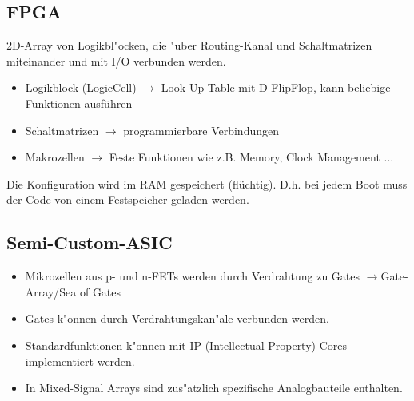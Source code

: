 \begin{scriptsize}
\begin{multicols}{2}
\subsection{FPGA}
2D-Array von Logikbl"ocken, die "uber Routing-Kanal und Schaltmatrizen miteinander und mit I/O verbunden werden.
\begin{itemize}
	\setlength{\itemsep}{1pt}
  \setlength{\parskip}{0pt}
  \setlength{\parsep}{0pt}
  
	\item Logikblock (LogicCell) $\rightarrow$ Look-Up-Table mit D-FlipFlop, kann beliebige Funktionen ausführen
	\item Schaltmatrizen $\rightarrow$ programmierbare Verbindungen
	\item Makrozellen $\rightarrow$ Feste Funktionen wie z.B. Memory, Clock Management ...
\end{itemize}
Die Konfiguration wird im RAM gespeichert (flüchtig). D.h. bei jedem Boot muss der Code von einem Festspeicher geladen werden.
\end{multicols}

%
%

\begin{multicols}{2}
\subsection{Semi-Custom-ASIC}
\begin{itemize}
	\setlength{\itemsep}{1pt}
  \setlength{\parskip}{0pt}
  \setlength{\parsep}{0pt}
  
	\item Mikrozellen aus p- und n-FETs werden durch Verdrahtung zu Gates 			
		$\rightarrow$Gate-Array/Sea of Gates
	\item Gates k"onnen durch Verdrahtungskan"ale verbunden werden.
	\item Standardfunktionen k"onnen mit IP (Intellectual-Property)-Cores implementiert werden.
	\item In Mixed-Signal Arrays sind zus"atzlich spezifische Analogbauteile enthalten.
\end{itemize}	
\vfill\null
\columnbreak	

\end{multicols}
\end{scriptsize}
